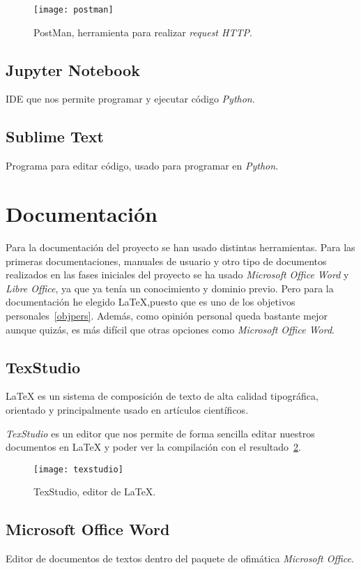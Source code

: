 \begin{figure}
	\centering
	\texttt{[image: postman]}
	\caption{PostMan, herramienta para realizar \textit{request HTTP}.}
	\label{fig:postman}
\end{figure}
\subsection{Jupyter Notebook}
IDE que nos permite programar y ejecutar código \textit{Python}.
\subsection{Sublime Text}
Programa para editar código, usado para programar en \textit{Python}.
\section{Documentación}
Para la documentación del proyecto se han usado distintas herramientas. Para las primeras documentaciones, manuales de usuario y otro tipo de documentos realizados en las fases iniciales del proyecto se ha usado \textit{Microsoft Office Word} y \textit{Libre Office}, ya que ya tenía un conocimiento y dominio previo. Pero para la documentación he elegido \LaTeX,puesto que es uno de los objetivos personales~\ref{objpers}. Además, como opinión personal queda bastante mejor aunque quizás, es más difícil que otras opciones como \textit{Microsoft Office Word}.
\subsection{TexStudio}
\LaTeX{} es un sistema de composición de texto de alta calidad tipográfica, orientado y principalmente usado en artículos científicos.

\textit{TexStudio} es un editor que nos permite de forma sencilla editar nuestros documentos en \LaTeX{} y poder ver la compilación con el resultado~\ref{fig:texstudio}.

\begin{figure}
	\centering
	\texttt{[image: texstudio]}
	\caption{TexStudio, editor de \LaTeX.}
	\label{fig:texstudio}
\end{figure}

\subsection{Microsoft Office Word}
Editor de documentos de textos dentro del paquete de ofimática \textit{Microsoft Office}.
